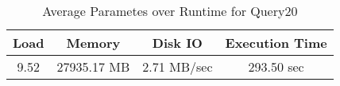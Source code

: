 \documentclass[../../main.tex]{subfiles}
\begin{document}
    \begin{table}
        \begin{center}
            \begin{tabular}{ |c|c|c|c| } 
            \hline
            Load & Memory & Disk IO & Execution Time\\
            \hline
            9.52 & 27935.17 MB & 2.71 MB/sec & 293.50 sec \\
            \hline
            \end{tabular}
            \\[1pt]
            \caption{Average Parametes over Runtime for Query20}
        \end{center}
    \end{table}
    \pagebreak
\end{document}
